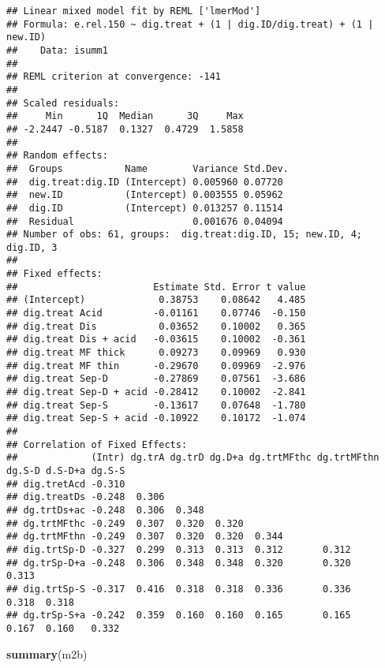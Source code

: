 \documentclass[
]{article}
\newenvironment{Shaded}{\begin{snugshade}}{\end{snugshade}}
\newcommand{\FunctionTok}[1]{\textcolor[rgb]{0.13,0.29,0.53}{\textbf{#1}}}
\newcommand{\NormalTok}[1]{#1}
\begin{document}
\begin{verbatim}
## Linear mixed model fit by REML ['lmerMod']
## Formula: e.rel.150 ~ dig.treat + (1 | dig.ID/dig.treat) + (1 | new.ID)
##    Data: isumm1
## 
## REML criterion at convergence: -141
## 
## Scaled residuals: 
##     Min      1Q  Median      3Q     Max 
## -2.2447 -0.5187  0.1327  0.4729  1.5858 
## 
## Random effects:
##  Groups           Name        Variance Std.Dev.
##  dig.treat:dig.ID (Intercept) 0.005960 0.07720 
##  new.ID           (Intercept) 0.003555 0.05962 
##  dig.ID           (Intercept) 0.013257 0.11514 
##  Residual                     0.001676 0.04094 
## Number of obs: 61, groups:  dig.treat:dig.ID, 15; new.ID, 4; dig.ID, 3
## 
## Fixed effects:
##                        Estimate Std. Error t value
## (Intercept)             0.38753    0.08642   4.485
## dig.treat Acid         -0.01161    0.07746  -0.150
## dig.treat Dis           0.03652    0.10002   0.365
## dig.treat Dis + acid   -0.03615    0.10002  -0.361
## dig.treat MF thick      0.09273    0.09969   0.930
## dig.treat MF thin      -0.29670    0.09969  -2.976
## dig.treat Sep-D        -0.27869    0.07561  -3.686
## dig.treat Sep-D + acid -0.28412    0.10002  -2.841
## dig.treat Sep-S        -0.13617    0.07648  -1.780
## dig.treat Sep-S + acid -0.10922    0.10172  -1.074
## 
## Correlation of Fixed Effects:
##             (Intr) dg.trA dg.trD dg.D+a dg.trtMFthc dg.trtMFthn dg.S-D d.S-D+a dg.S-S
## dig.tretAcd -0.310                                                                   
## dig.treatDs -0.248  0.306                                                            
## dg.trtDs+ac -0.248  0.306  0.348                                                     
## dg.trtMFthc -0.249  0.307  0.320  0.320                                              
## dg.trtMFthn -0.249  0.307  0.320  0.320  0.344                                       
## dig.trtSp-D -0.327  0.299  0.313  0.313  0.312       0.312                           
## dg.trSp-D+a -0.248  0.306  0.348  0.348  0.320       0.320       0.313               
## dig.trtSp-S -0.317  0.416  0.318  0.318  0.336       0.336       0.318  0.318        
## dg.trSp-S+a -0.242  0.359  0.160  0.160  0.165       0.165       0.167  0.160   0.332
\end{verbatim}

\begin{Shaded}
\begin{Highlighting}[]
\FunctionTok{summary}\NormalTok{(m2b)}
\end{Highlighting}
\end{Shaded}
\end{document}

